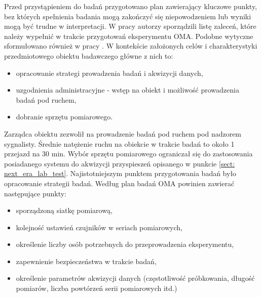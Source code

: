 Przed przystąpieniem do badań przygotowano plan zawierający kluczowe punkty, bez których spełnienia badania mogą zakończyć się niepowodzeniem lub wyniki mogą być trudne w interpretacji. W pracy \cite{Brincker2015} autorzy sporządzili listę zaleceń, które należy wypełnić w trakcie przygotowań eksperymentu OMA. Podobne wytyczne sformułowano również w pracy \cite{Poprawa2018}. W kontekście założonych celów i charakterystyki przedmiotowego obiektu badawczego główne z nich to:
\begin{itemize}
\item opracowanie strategi prowadzenia badań i akwizycji danych,
\item uzgodnienia administracyjne - wstęp na obiekt i możliwość prowadzenia badań pod ruchem,
\item dobranie sprzętu pomiarowego.
\end{itemize}

Zarządca obiektu zezwolił na prowadzenie badań pod ruchem pod nadzorem sygnalisty. Średnie natężenie ruchu na obiekcie w trakcie badań to około 1 przejazd na 30 min. Wybór sprzętu pomiarowego ograniczał się do zastosowania posiadanego systemu do akwizycji przyspieszeń opisanego w punkcie \ref{sect: next_era_lab_test}. Najistotniejszym punktem przygotowania badań było opracowanie strategii badań. Według \cite{Brincker2015} plan badań OMA powinien zawierać następujące punkty:
\begin{itemize}
	\item sporządzoną siatkę pomiarową,
	\item kolejność ustawień czujników w seriach pomiarowych,
	\item określenie liczby osób potrzebnych do przeprowadzenia eksperymentu,
	\item zapewnienie bezpieczeństwa w trakcie badań,
	\item określenie parametrów akwizycji danych (częstotliwość próbkowania, długość pomiarów, liczba powtórzeń serii pomiarowych itd.)
\end{itemize}

